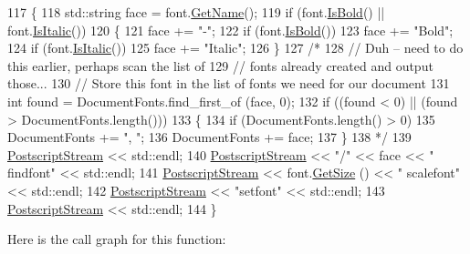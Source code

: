 \begin{DoxyCode}
117 \{
118     std::string face = font.\mbox{\hyperlink{class_g_base_font_a202a60eadc6436354527de8ccd4a983d}{GetName}}();
119     \textcolor{keywordflow}{if} (font.\mbox{\hyperlink{class_g_base_font_a22abd1f8dfcda6124ffedb8dc26bfcd3}{IsBold}}() || font.\mbox{\hyperlink{class_g_base_font_aec31b5754f2be8ae2552b2bfd37a76d1}{IsItalic}}())
120     \{
121         face += \textcolor{stringliteral}{"-"};
122         \textcolor{keywordflow}{if} (font.\mbox{\hyperlink{class_g_base_font_a22abd1f8dfcda6124ffedb8dc26bfcd3}{IsBold}}())
123             face += \textcolor{stringliteral}{"Bold"};
124         \textcolor{keywordflow}{if} (font.\mbox{\hyperlink{class_g_base_font_aec31b5754f2be8ae2552b2bfd37a76d1}{IsItalic}}())
125             face += \textcolor{stringliteral}{"Italic"};
126     \}
127 \textcolor{comment}{/*}
128 \textcolor{comment}{    // Duh -- need to do this earlier, perhaps scan the list of}
129 \textcolor{comment}{    // fonts already created and output those...}
130 \textcolor{comment}{    // Store this font in the list of fonts we need for our document}
131 \textcolor{comment}{    int found = DocumentFonts.find\_first\_of (face, 0);}
132 \textcolor{comment}{    if ((found < 0) || (found > DocumentFonts.length()))}
133 \textcolor{comment}{    \{}
134 \textcolor{comment}{        if (DocumentFonts.length() > 0)}
135 \textcolor{comment}{            DocumentFonts += ", ";}
136 \textcolor{comment}{        DocumentFonts += face;}
137 \textcolor{comment}{    \}}
138 \textcolor{comment}{*/}
139     \mbox{\hyperlink{class_g_postscript_port_a0fb398f1c65b3ccb0efccd509f60d20d}{PostscriptStream}} << std::endl;
140     \mbox{\hyperlink{class_g_postscript_port_a0fb398f1c65b3ccb0efccd509f60d20d}{PostscriptStream}} << \textcolor{stringliteral}{"/"} << face << \textcolor{stringliteral}{" findfont"} << std::endl;
141     \mbox{\hyperlink{class_g_postscript_port_a0fb398f1c65b3ccb0efccd509f60d20d}{PostscriptStream}} << font.\mbox{\hyperlink{class_g_base_font_a62e761a8a0c0f60f01d8a0d451640e69}{GetSize}} () << \textcolor{stringliteral}{" scalefont"} << std::endl;
142     \mbox{\hyperlink{class_g_postscript_port_a0fb398f1c65b3ccb0efccd509f60d20d}{PostscriptStream}} << \textcolor{stringliteral}{"setfont"} << std::endl;
143     \mbox{\hyperlink{class_g_postscript_port_a0fb398f1c65b3ccb0efccd509f60d20d}{PostscriptStream}} << std::endl;
144 \}
\end{DoxyCode}
Here is the call graph for this function\+:\nopagebreak
